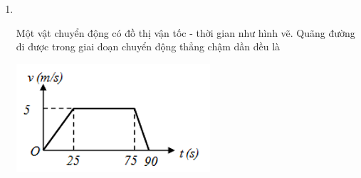 \begin{enumerate}[label=\bfseries Câu \arabic*:,leftmargin=1.5cm]
\item {}\\
{\begin{minipage}[l]{0.6\textwidth}
		Một vật chuyển động có đồ thị vận tốc - thời gian như hình vẽ. Quãng đường đi được trong giai đoạn chuyển động thẳng chậm dần đều là
	\end{minipage}
\begin{minipage}{0.4\textwidth}
	\begin{center}
		\includegraphics[width=0.6\linewidth]{../figs/VN10-2023-PH-TP009-P-3}
	\end{center}
\end{minipage}
}





\end{enumerate}
